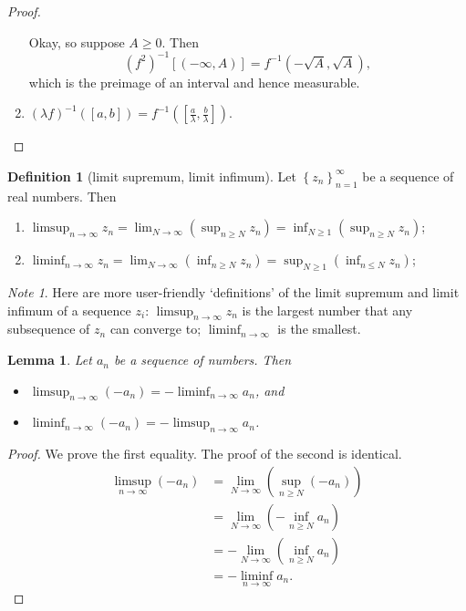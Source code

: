 \documentclass[a4paper]{scrartcl}
\theoremstyle{definition}
\newtheorem{definition}{Definition}[section]
\theoremstyle{plain}
\newtheorem{lemma}{Lemma}[section]
\theoremstyle{remark}
\newtheorem{note}{Note}[section]
\begin{document}
\begin{proof}
\begin{enumerate}
      Okay, so suppose $A \geq 0$. Then
      \begin{equation*}
        {(f^{2})}^{-1}[(-\infty, A)] = f^{-1}(-\sqrt{A}, \sqrt{A}),
      \end{equation*}
      which is the preimage of an interval and hence measurable.

    \item ${(\lambda f)}^{-1}([a, b]) = f^{-1}\left( \left[ \frac{a}{\lambda}, \frac{b}{\lambda} \right] \right)$.
  \end{enumerate}
\end{proof}

\begin{definition}[limit supremum, limit infimum]
  \label{def:limsupliminf}
  Let ${\left\{ z_{n} \right\}}_{n=1}^{\infty}$ be a sequence of real numbers. Then
  \begin{enumerate}
    \item $\displaystyle\limsup_{n \to \infty} z_{n} = \lim_{N \to \infty}\left( \sup_{n \geq N} z_{n} \right) = \inf_{N \geq 1}\left( \sup_{n \geq N} z_{n} \right)$;

    \item $\displaystyle\liminf_{n \to \infty} z_{n} = \lim_{N \to \infty}\left( \inf_{n \geq N} z_{n} \right) = \sup_{N \geq 1} \left(  \inf_{n \leq N} z_{n} \right)$;
  \end{enumerate}
\end{definition}
\begin{note}
  Here are more user-friendly `definitions' of the limit supremum and limit infimum of a sequence $z_{i}$: $\limsup_{n \to \infty} z_{n}$ is the largest number that any subsequence of $z_{n}$ can converge to; $\liminf_{n \to \infty}$ is the smallest.
\end{note}

\begin{lemma}
  \label{lemma:limsupofnegativeisnegativeliminf}
  Let $a_{n}$ be a sequence of numbers. Then
  \begin{itemize}
    \item $\limsup_{n \to \infty} (- a_{n}) = - \liminf_{n \to \infty} a_{n}$, and
    \item $\liminf_{n \to \infty} (- a_{n}) = - \limsup_{n \to \infty} a_{n}$.
  \end{itemize}
\end{lemma}
\begin{proof}
  We prove the first equality. The proof of the second is identical.
  \begin{align*}
    \limsup_{n \to \infty} (-a_{n}) &= \lim_{N \to \infty}\left( \sup_{n \geq N} (-a_{n}) \right) \\
    &= \lim_{N \to \infty} \left( -\inf_{n \geq N} a_{n} \right) \\
    &= -\lim_{N \to \infty} \left( \inf_{n \geq N} a_{n} \right) \\
    &= -\liminf_{n \to \infty} a_{n}.
  \end{align*}
\end{proof}
\end{document}
